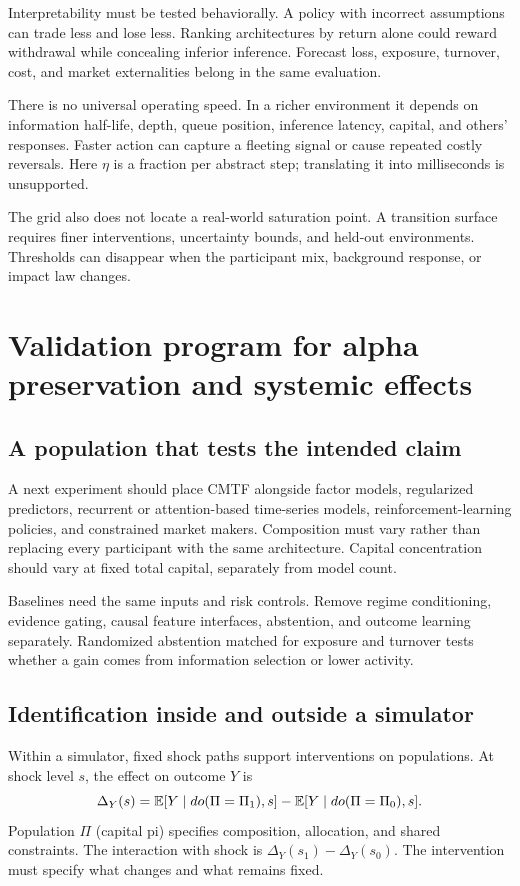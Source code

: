 Interpretability must be tested behaviorally. A policy with incorrect assumptions can trade less and lose less. Ranking architectures by return alone could reward withdrawal while concealing inferior inference. Forecast loss, exposure, turnover, cost, and market externalities belong in the same evaluation.

There is no universal operating speed. In a richer environment it depends on information half-life, depth, queue position, inference latency, capital, and others' responses. Faster action can capture a fleeting signal or cause repeated costly reversals. Here $\eta$ is a fraction per abstract step; translating it into milliseconds is unsupported.

The grid also does not locate a real-world saturation point. A transition surface requires finer interventions, uncertainty bounds, and held-out environments. Thresholds can disappear when the participant mix, background response, or impact law changes.

\section{Validation program for alpha preservation and systemic effects}
\subsection{A population that tests the intended claim}
A next experiment should place CMTF alongside factor models, regularized predictors, recurrent or attention-based time-series models, reinforcement-learning policies, and constrained market makers. Composition must vary rather than replacing every participant with the same architecture. Capital concentration should vary at fixed total capital, separately from model count.

Baselines need the same inputs and risk controls. Remove regime conditioning, evidence gating, causal feature interfaces, abstention, and outcome learning separately. Randomized abstention matched for exposure and turnover tests whether a gain comes from information selection or lower activity.

\subsection{Identification inside and outside a simulator}
Within a simulator, fixed shock paths support interventions on populations. At shock level $s$, the effect on outcome $Y$ is
\[
\Delta_Y(s)=\mathbb E[Y\mid do(\Pi=\Pi_1),s]-\mathbb E[Y\mid do(\Pi=\Pi_0),s].
\]
Population $\Pi$ (capital pi) specifies composition, allocation, and shared constraints. The interaction with shock is $\Delta_Y(s_1)-\Delta_Y(s_0)$. The intervention must specify what changes and what remains fixed.

